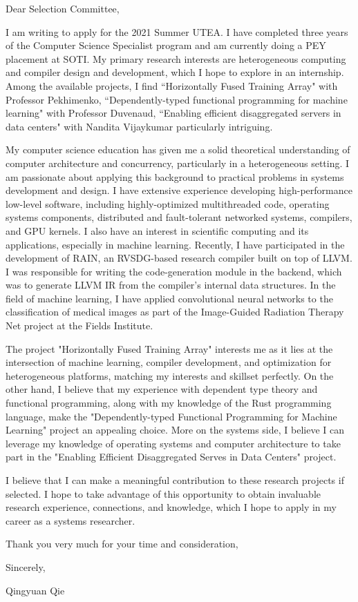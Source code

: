 \documentclass[11pt]{article}
\begin{document}
\setlength{\parindent}{0em}
\setlength{\parskip}{1em}
\noindent
Dear Selection Committee,

\vspace{5mm}

I am writing to apply for the 2021 Summer UTEA. I have completed three years of the Computer Science Specialist program and am currently doing a PEY placement at SOTI. My primary research interests are heterogeneous computing and compiler design and development, which I hope to explore in an internship. Among the available projects, I find ``Horizontally Fused Training Array" with Professor Pekhimenko, ``Dependently-typed functional programming for machine learning" with Professor Duvenaud, ``Enabling efficient disaggregated servers in data centers" with Nandita Vijaykumar particularly intriguing.

My computer science education has given me a solid theoretical understanding of computer architecture and concurrency, particularly in a heterogeneous setting. I am passionate about applying this background to practical problems in systems development and design. I have extensive experience developing high-performance low-level software, including highly-optimized multithreaded code, operating systems components, distributed and fault-tolerant networked systems, compilers, and GPU kernels. I also have an interest in scientific computing and its applications, especially in machine learning. Recently, I have participated in the development of RAIN, an RVSDG-based research compiler built on top of LLVM. I was responsible for writing the code-generation module in the backend, which was to generate LLVM IR from the compiler's internal data structures. In the field of machine learning, I have applied convolutional neural networks to the classification of medical images as part of the Image-Guided Radiation Therapy Net project at the Fields Institute.

The project "Horizontally Fused Training Array" interests me as it lies at the intersection of machine learning, compiler development, and optimization for heterogeneous platforms, matching my interests and skillset perfectly. On the other hand, I believe that my experience with dependent type theory and functional programming, along with my knowledge of the Rust programming language, make the "Dependently-typed Functional Programming for Machine Learning" project an appealing choice. More on the systems side, I believe I can leverage my knowledge of operating systems and computer architecture to take part in the "Enabling Efficient Disaggregated Serves in Data Centers" project.

I believe that I can make a meaningful contribution to these research projects if selected. I hope to take advantage of this opportunity to obtain invaluable research experience, connections, and knowledge, which I hope to apply in my career as a systems researcher.

\noindent
Thank you very much for your time and consideration,

\vspace{5mm}
\noindent
Sincerely,

\noindent
Qingyuan Qie
\end{document}
